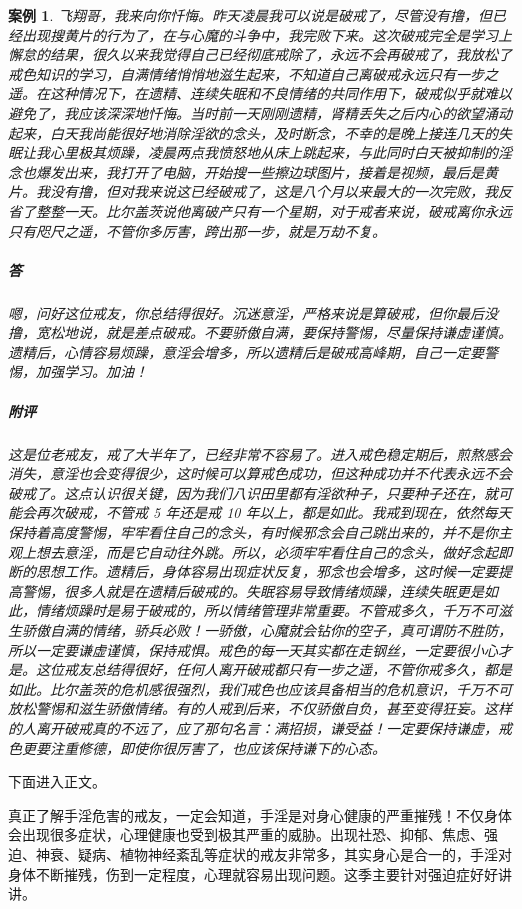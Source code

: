 \documentclass{ctexart}
\newtheorem{case}{案例}
\begin{document}
\begin{case}
    飞翔哥，我来向你忏悔。昨天凌晨我可以说是破戒了，尽管没有撸，但已经出现搜黄片的行为了，在与心魔的斗争中，我完败下来。这次破戒完全是学习上懈怠的结果，很久以来我觉得自己已经彻底戒除了，永远不会再破戒了，我放松了戒色知识的学习，自满情绪悄悄地滋生起来，不知道自己离破戒永远只有一步之遥。在这种情况下，在遗精、连续失眠和不良情绪的共同作用下，破戒似乎就难以避免了，我应该深深地忏悔。当时前一天刚刚遗精，肾精丢失之后内心的欲望涌动起来，白天我尚能很好地消除淫欲的念头，及时断念，不幸的是晚上接连几天的失眠让我心里极其烦躁，凌晨两点我愤怒地从床上跳起来，与此同时白天被抑制的淫念也爆发出来，我打开了电脑，开始搜一些擦边球图片，接着是视频，最后是黄片。我没有撸，但对我来说这已经破戒了，这是八个月以来最大的一次完败，我反省了整整一天。比尔盖茨说他离破产只有一个星期，对于戒者来说，破戒离你永远只有咫尺之遥，不管你多厉害，跨出那一步，就是万劫不复。
    \subparagraph{答} 嗯，问好这位戒友，你总结得很好。沉迷意淫，严格来说是算破戒，但你最后没撸，宽松地说，就是差点破戒。不要骄傲自满，要保持警惕，尽量保持谦虚谨慎。遗精后，心情容易烦躁，意淫会增多，所以遗精后是破戒高峰期，自己一定要警惕，加强学习。加油！
    \subparagraph{附评} 这是位老戒友，戒了大半年了，已经非常不容易了。进入戒色稳定期后，煎熬感会消失，意淫也会变得很少，这时候可以算戒色成功，但这种成功并不代表永远不会破戒了。这点认识很关键，因为我们八识田里都有淫欲种子，只要种子还在，就可能会再次破戒，不管戒 5 年还是戒 10 年以上，都是如此。我戒到现在，依然每天保持着高度警惕，牢牢看住自己的念头，有时候邪念会自己跳出来的，并不是你主观上想去意淫，而是它自动往外跳。所以，必须牢牢看住自己的念头，做好念起即断的思想工作。遗精后，身体容易出现症状反复，邪念也会增多，这时候一定要提高警惕，很多人就是在遗精后破戒的。失眠容易导致情绪烦躁，连续失眠更是如此，情绪烦躁时是易于破戒的，所以情绪管理非常重要。不管戒多久，千万不可滋生骄傲自满的情绪，骄兵必败！一骄傲，心魔就会钻你的空子，真可谓防不胜防，所以一定要谦虚谨慎，保持戒惧。戒色的每一天其实都在走钢丝，一定要很小心才是。这位戒友总结得很好，任何人离开破戒都只有一步之遥，不管你戒多久，都是如此。比尔盖茨的危机感很强烈，我们戒色也应该具备相当的危机意识，千万不可放松警惕和滋生骄傲情绪。有的人戒到后来，不仅骄傲自负，甚至变得狂妄。这样的人离开破戒真的不远了，应了那句名言：满招损，谦受益！一定要保持谦虚，戒色更要注重修德，即使你很厉害了，也应该保持谦下的心态。
\end{case}

下面进入正文。

真正了解手淫危害的戒友，一定会知道，手淫是对身心健康的严重摧残！不仅身体会出现很多症状，心理健康也受到极其严重的威胁。出现社恐、抑郁、焦虑、强迫、神衰、疑病、植物神经紊乱等症状的戒友非常多，其实身心是合一的，手淫对身体不断摧残，伤到一定程度，心理就容易出现问题。这季主要针对强迫症好好讲讲。
\end{document}
